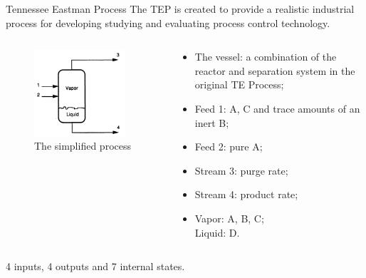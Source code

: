 \documentclass[10pt]{beamer}
\begin{document}
\begin{frame}{Tennessee Eastman Process}
  The TEP is created to provide a realistic industrial process for developing studying and evaluating process control technology. 
  \begin{columns}
    \begin{column}{0.45\textwidth}
      \begin{figure}
	\includegraphics[width=0.9\textwidth]{simplifiedmodel.png}
	\caption{The simplified process}
      \end{figure}
    \end{column}
    \begin{column}{0.55\textwidth} 		
      \begin{itemize}
	\item The vessel: a combination of the reactor and separation system in the original TE Process;
	\item Feed 1: A, C and trace amounts of an inert B;
	\item Feed 2: pure A;
	\item Stream 3: purge rate;
	\item Stream 4: product rate;
	\item Vapor: A, B, C;\\
	  Liquid: D.
      \end{itemize}
    \end{column}
  \end{columns}
  4 inputs, 4 outputs and 7 internal states.
\end{frame}
\end{document}
